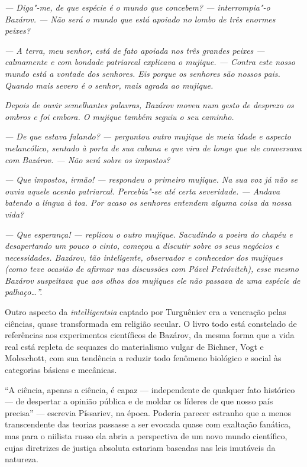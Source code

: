 \emph{--- Diga"-me, de que espécie é o mundo que concebem? --- interrompia"-o
Bazárov. --- Não será o mundo que está apoiado no lombo de três enormes
peixes?}

\emph{--- A terra, meu senhor, está de fato apoiada nos três grandes
peixes --- calmamente e com bondade patriarcal explicava o mujique. ---
Contra este nosso mundo está a vontade dos senhores. Eis porque os
senhores são nossos pais. Quando mais severo é o senhor, mais agrada ao
mujique. }

\emph{Depois de ouvir semelhantes palavras, Bazárov moveu num gesto de
desprezo os ombros e foi embora. O mujique também seguiu o seu caminho.}

\emph{--- De que estava falando? --- perguntou outro mujique de meia idade
e aspecto melancólico, sentado à porta de sua cabana e que vira de longe
que ele conversava com Bazárov. --- Não será sobre os impostos?}

\emph{--- Que impostos, irmão! --- respondeu o primeiro mujique. Na sua voz
já não se ouvia aquele acento patriarcal. Percebia"-se até certa
severidade. --- Andava batendo a língua à toa. Por acaso os senhores
entendem alguma coisa da nossa vida?}

\emph{--- Que esperança! --- replicou o outro mujique. Sacudindo a poeira
do chapéu e desapertando um pouco o cinto, começou a discutir sobre os
seus negócios e necessidades. Bazárov, tão inteligente, observador e
conhecedor dos mujiques (como teve ocasião de afirmar nas discussões com
Pável Petróvitch), esse mesmo Bazárov suspeitava que aos olhos dos
mujiques ele não passava de uma espécie de palhaço\ldots{}''.}

Outro aspecto da \emph{intelligentsia} captado por Turguêniev era a
veneração pelas ciências, quase transformada em religião secular. O
livro todo está constelado de referências aos experimentos científicos
de Bazárov, da mesma forma que a vida real está repleta de sequazes do
materialismo vulgar de Bichner, Vogt e Moleschott, com sua tendência a
reduzir todo fenômeno biológico e social às categorias básicas e
mecânicas.

``A ciência, apenas a ciência, é capaz --- independente de qualquer fato
histórico --- de despertar a opinião pública e de moldar os líderes de
que nosso país precisa'' --- escrevia Píssariev, na época. Poderia parecer
estranho que a menos transcendente das teorias passasse a ser evocada
quase com exaltação fanática, mas para o niilista russo ela abria a
perspectiva de um novo mundo científico, cujas diretrizes de justiça
absoluta estariam baseadas nas leis imutáveis da natureza.

